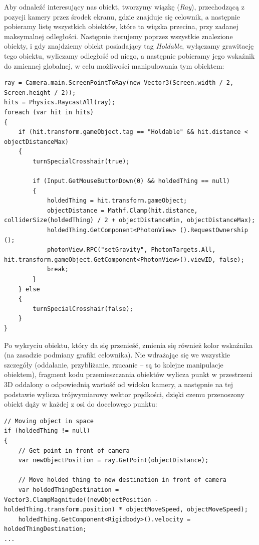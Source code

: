 \documentclass[openright]{xmgr}
\begin{document}
    Aby odnaleźć interesujący nas obiekt, tworzymy wiązkę (\textit{Ray}), przechodzącą z pozycji kamery przez środek ekranu, gdzie znajduje się celownik, a następnie pobieramy listę wszystkich obiektów, które ta wiązka przecina, przy zadanej maksymalnej odległości. Następnie iterujemy poprzez wszystkie znalezione obiekty, i gdy znajdziemy obiekt posiadający tag \textit{Holdable}, wyłączamy grawitację tego obiektu, wyliczamy odległość od niego, a następnie pobieramy jego wskaźnik do zmiennej globalnej, w celu możliwości manipulowania tym obiektem:

\begin{minipage}{\textwidth}
\begin{lstlisting}[caption={Algorytm wykrywania obiektów w obrębie Maga, które mogą zostać przeniesione}]
ray = Camera.main.ScreenPointToRay(new Vector3(Screen.width / 2, Screen.height / 2));
hits = Physics.RaycastAll(ray);
foreach (var hit in hits)
{
    if (hit.transform.gameObject.tag == "Holdable" && hit.distance < objectDistanceMax)
    {
        turnSpecialCrosshair(true);

        if (Input.GetMouseButtonDown(0) && holdedThing == null)
        {
            holdedThing = hit.transform.gameObject;
            objectDistance = Mathf.Clamp(hit.distance, colliderSize(holdedThing) / 2 + objectDistanceMin, objectDistanceMax);
            holdedThing.GetComponent<PhotonView> ().RequestOwnership ();
            photonView.RPC("setGravity", PhotonTargets.All, hit.transform.gameObject.GetComponent<PhotonView>().viewID, false);
            break;
        }
    } else
    {
        turnSpecialCrosshair(false);
    }
}
\end{lstlisting}
\end{minipage}

    Po wykryciu obiektu, który da się przenieść, zmienia się również kolor wskaźnika (na zasadzie podmiany grafiki celownika). Nie wdrażając się we wszystkie szczegóły (oddalanie, przybliżanie, rzucanie -- są to kolejne manipulacje obiektem), fragment kodu przemieszczania obiektów wylicza punkt w przestrzeni 3D oddalony o odpowiednią wartość od widoku kamery, a następnie na tej podstawie wylicza trójwymiarowy wektor prędkości, dzięki czemu przenoszony obiekt dąży w każdej z osi do docelowego punktu:

\begin{minipage}{\textwidth}
\begin{lstlisting}[caption={Algorytm przenoszenia obiektów}]
// Moving object in space
if (holdedThing != null)
{
    // Get point in front of camera
    var newObjectPosition = ray.GetPoint(objectDistance);

    // Move holded thing to new destination in front of camera
    var holdedThingDestination = Vector3.ClampMagnitude((newObjectPosition - holdedThing.transform.position) * objectMoveSpeed, objectMoveSpeed);
    holdedThing.GetComponent<Rigidbody>().velocity = holdedThingDestination;
...
\end{lstlisting}
\end{minipage}
\end{document}
